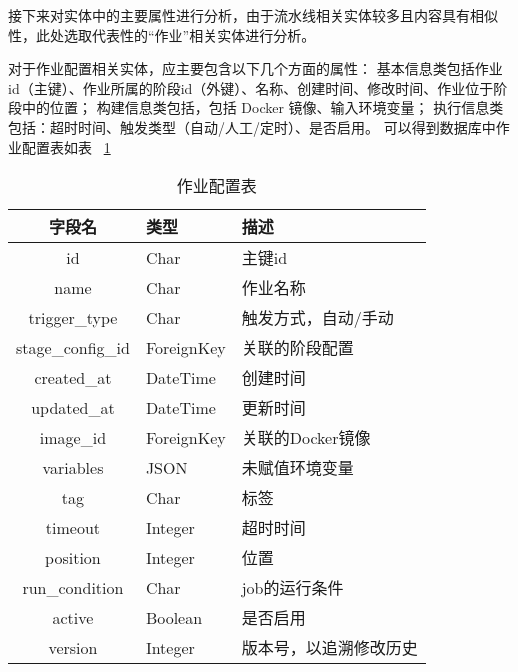 接下来对实体中的主要属性进行分析，由于流水线相关实体较多且内容具有相似性，此处选取代表性的“作业”相关实体进行分析。

对于作业配置相关实体，应主要包含以下几个方面的属性：
基本信息类包括作业id（主键）、作业所属的阶段id（外键）、名称、创建时间、修改时间、作业位于阶段中的位置；
构建信息类包括，包括 Docker 镜像、输入环境变量；
执行信息类包括：超时时间、触发类型（自动/人工/定时）、是否启用。
可以得到数据库中作业配置表如表~ \ref{tab:作业配置表}

\begin{table}[h]
  \centering
  \caption{作业配置表}
  \label{tab:作业配置表}
  \begin{tabular}{cll}
    \toprule
    字段名                  & 类型            & 描述                                       \\
    \midrule
    id                      & Char           & 主键id                                   \\
    name                    & Char           & 作业名称                                   \\
    trigger\_type           & Char           & 触发方式，自动/手动                        \\
    stage\_config\_id       & ForeignKey     & 关联的阶段配置                             \\
    created\_at             & DateTime       & 创建时间                                    \\
    updated\_at             & DateTime       & 更新时间                                    \\
    image\_id               & ForeignKey     & 关联的Docker镜像                            \\
    variables               & JSON           & 未赋值环境变量                              \\
    tag                     & Char           & 标签                                       \\
    timeout                 & Integer        & 超时时间                                    \\
    position                & Integer        & 位置                                        \\
    run\_condition          & Char           & job的运行条件                               \\
    active                  & Boolean        & 是否启用                                    \\
    version                 & Integer        & 版本号，以追溯修改历史                        \\
    \bottomrule
  \end{tabular}
\end{table}

